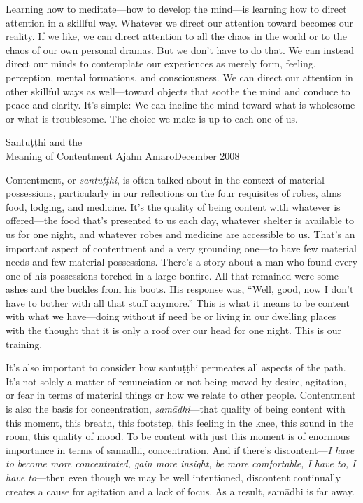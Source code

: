 
Learning how to meditate---how to develop the mind---is learning how to 
direct attention in a skillful way. Whatever we direct our attention 
toward becomes our reality. If we like, we can direct attention to all 
the chaos in the world or to the chaos of our own personal dramas. But 
we don't have to do that. We can instead direct our minds to 
contemplate our experiences as merely form, feeling, perception, mental 
formations, and consciousness. We can direct our attention in other 
skillful ways as well---toward objects that soothe the mind and conduce 
to peace and clarity. It's simple: We can incline the mind toward what 
is wholesome or what is troublesome. The choice we make is up to each 
one of us.

{Santuṭṭhi and the\\Meaning of Contentment}
{Ajahn Amaro}{December 2008}

Contentment, or \emph{santuṭṭhi}, is often talked about in the 
context of material possessions, particularly in our reflections on the 
four requisites of robes, alms food, lodging, and medicine. It's the 
quality of being content with whatever is offered---the food that's 
presented to us each day, whatever shelter is available to us for one 
night, and whatever robes and medicine are accessible to us. That's an 
important aspect of contentment and a very grounding one---to have few 
material needs and few material possessions. There's a story about a 
man who found every one of his possessions torched in a large bonfire. 
All that remained were some ashes and the buckles from his boots. His 
response was, ``Well, good, now I don't have to bother with all that 
stuff anymore.'' This is what it means to be content with what we 
have---doing without if need be or living in our dwelling places with 
the thought that it is only a roof over our head for one night. This is 
our training.

It's also important to consider how santuṭṭhi permeates all aspects of
the path. It's not solely a matter of renunciation or not being moved by
desire, agitation, or fear in terms of material things or how we relate
to other people. Contentment is also the basis for concentration,
\emph{samādhi}---that quality of being content with this moment, this
breath, this footstep, this \mbox{feeling} in the knee, this sound in
the room, this quality of mood. To be content with just this moment is
of enormous importance in terms of samādhi, concentration.  And if
there's discontent---\emph{I have to become more concentrated, gain more
insight, be more comfortable, I have to, I have to}---then even though
we may be well intentioned, discontent continually creates a cause for
agitation and a lack of focus. As a result, samādhi is far away.

